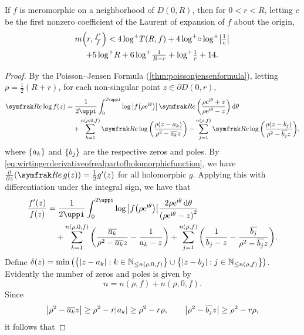 \begin{proposition}\label{prop:nevanlinnalogdiffproximityestimate}
    If \(f\) is meromorphic on a neighborhood of \(\overline{D(0,R)}\), then for \(0<r<R\), letting \(c\) be the first nonzero coefficient of the Laurent of expansion of \(f\) about the origin,
    \begin{multline}
        m\qty(r,\tfrac{f'}f)<4\mathop{\log^+\!} T(R,f)+4\mathop{\log^+\!}\circ\mathop{\log^+\!}\abs{\tfrac1c}\\
        +5\mathop{\log^+\!} R+6\mathop{\log^+\!}\tfrac1{R-r}+\mathop{\log^+\!}\tfrac1r+14.\label{eq:nevanlinnalogdiffproximityestimate_statement}
    \end{multline}
\end{proposition}
\begin{proof}
    By the Poisson--Jensen Formula (\cref{thm:poissonjensenformula}), letting \(\rho=\tfrac12(R+r)\), for each non-singular point \(z\in\partial D(0,r)\),
    \begin{align*}
        \Re\log f(z)&=\frac1{2\uppi}\int_0^{2\uppi}\log\abs{f\qty(\rho\ee^{\ii\theta})}\Re\qty(\frac{\rho\ee^{\ii\theta}+z}{\rho\ee^{\ii\theta}-z})\dd{\theta}\\
        &\quad+\sum_{k=1}^{n(\rho,0,f)}\Re\log\qty(\frac{\rho\qty(z-a_k)}{\rho^2-\overline{a_k}z})-\sum_{j=1}^{n(\rho,f)}\Re\log\qty(\frac{\rho\qty(z-b_j)}{\rho^2-\overline{b_j}z}),
    \end{align*}
    where \(\qty{a_k}\) and \(\qty{b_j}\) are the respective zeros and poles. By \cref{eq:wirtingerderivativeofrealpartofholomorphicfunction}, we have \(\textstyle\pdv{z}(\Re g(z))=\tfrac12g'(z)\) for all holomorphic \(g\). Applying this with differentiation under the integral sign, we have that
    \begin{align*}
        \frac{f'(z)}{f(z)}&=\frac1{2\uppi}\int_0^{2\uppi}\log\abs{f\qty(\rho\ee^{\ii\theta})}\frac{2\rho\ee^{\ii\theta}\dd{\theta}}{\qty(\rho\ee^{\ii\theta}-z)^2}\\
        &\quad+\sum_{k=1}^{n(\rho,0,f)}\qty(\frac{\overline{a_k}}{\rho^2-\overline{a_k}z}-\frac1{a_k-z})+\sum_{j=1}^{n(\rho,f)}\qty(\frac1{b_j-z}-\frac{\overline{b_j}}{\rho^2-\overline{b_j}z}).
    \end{align*}
    Define \(\delta(z)=\min\qty(\cbraces{\abs{z-a_k}}{k\in\mathbb{N}_{\leq n(\rho,0,f)}}\cup\cbraces{\abs{z-b_j}}{j\in\mathbb{N}_{\leq n(\rho,f)}})\). Evidently the number of zeros and poles is given by \[n=n(\rho,f)+n(\rho,0,f).\]
    Since \[\abs{\rho^2-\overline{a_k}z}\geq\rho^2-r\abs{a_k}\geq\rho^2-r\rho,\qquad\abs{\rho^2-\overline{b_j}z}\geq\rho^2-r\rho,\]
    it follows that

\end{proof}
